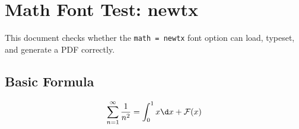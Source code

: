 \documentclass[lang = en, math = newtx, font = none, mode = simple]{elegantbook-l3}
\begin{document}
\frontmatter
\tableofcontents

\mainmatter
\chapter{Math Font Test: newtx}

This document checks whether the \texttt{math = newtx} font option can load,
typeset, and generate a PDF correctly.

\section{Basic Formula}

\[
  \sum_{n=1}^{\infty} \frac{1}{n^2}
  =
  \int_0^1 x\d x + \mathcal{F}(x)
\]
\end{document}
